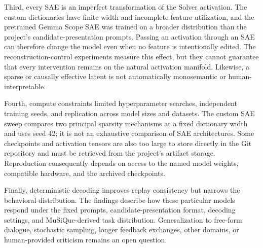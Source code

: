 Third, every SAE is an imperfect transformation of the Solver activation. The
custom dictionaries have finite width and incomplete feature utilization, and
the pretrained Gemma Scope SAE was trained on a broader distribution than the
project's candidate-presentation prompts. Passing an activation through an SAE
can therefore change the model even when no feature is intentionally edited.
The reconstruction-control experiments measure this effect, but they cannot
guarantee that every intervention remains on the natural activation manifold.
Likewise, a sparse or causally effective latent is not automatically
monosemantic or human-interpretable.

Fourth, compute constraints limited hyperparameter searches, independent
training seeds, and replication across model sizes and datasets. The custom
SAE sweep compares two principal sparsity mechanisms at a fixed dictionary
width and uses seed 42; it is not an exhaustive comparison of SAE
architectures. Some checkpoints and activation tensors are also too large to
store directly in the Git repository and must be retrieved from the project's
artifact storage. Reproduction consequently depends on access to the named
model weights, compatible hardware, and the archived checkpoints.

Finally, deterministic decoding improves replay consistency but narrows the
behavioral distribution. The findings describe how these particular models
respond under the fixed prompts, candidate-presentation format, decoding
settings, and MuSiQue-derived task distribution. Generalization to free-form
dialogue, stochastic sampling, longer feedback exchanges, other domains, or
human-provided criticism remains an open question.
